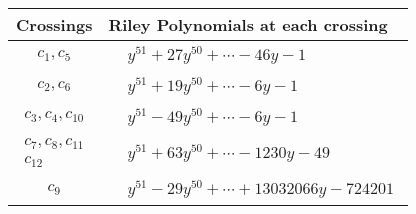 \documentclass[1p]{elsarticle_modified}
\theoremstyle{definition}
\begin{document}
\begin{tabular}{m{50pt}|m{274pt}}
Crossings & \hspace{64pt}Riley Polynomials at each crossing \\
\hline $$\begin{aligned}c_{1},c_{5}\end{aligned}$$&$\begin{aligned}
&y^{51}+27 y^{50}+\cdots-46 y-1
\end{aligned}$\\
\hline $$\begin{aligned}c_{2},c_{6}\end{aligned}$$&$\begin{aligned}
&y^{51}+19 y^{50}+\cdots-6 y-1
\end{aligned}$\\
\hline $$\begin{aligned}c_{3},c_{4},c_{10}\end{aligned}$$&$\begin{aligned}
&y^{51}-49 y^{50}+\cdots-6 y-1
\end{aligned}$\\
\hline $$\begin{aligned}c_{7},c_{8},c_{11}\\c_{12}\end{aligned}$$&$\begin{aligned}
&y^{51}+63 y^{50}+\cdots-1230 y-49
\end{aligned}$\\
\hline $$\begin{aligned}c_{9}\end{aligned}$$&$\begin{aligned}
&y^{51}-29 y^{50}+\cdots+13032066 y-724201
\end{aligned}$\\
\hline
\end{tabular}
\vskip 2pc
\end{document}
